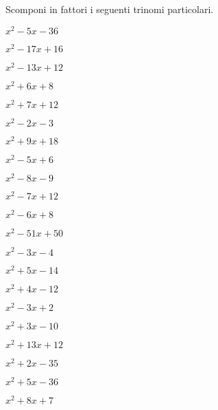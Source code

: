 \subsubsection*{}

\begin{esercizio}
 \label{ese:17.1}
 Scomponi in fattori i seguenti trinomi particolari.
 \begin{multicols}{3}
 \begin{enumeratea}
 \item $x^{2}-5x-36$
 \item $x^{2}-17x+16$
 \item $x^{2}-13x+12$
 \item $x^{2}+6x+8$
 \item $x^{2}+7x+12$
 \item $x^{2}-2x-3$
 \item $x^{2}+9x+18$
 \item $x^{2}-5x+6$
 \item $x^{2}-8x-9$
 \item $x^{2}-7x+12$
 \item $x^{2}-6x+8$
 \item $x^{2}-51x+50$
 \item $x^{2}-3x-4$
 \item $x^{2}+5x-14$
 \item $x^{2}+4x-12$
 \item $x^{2}-3x+2$
 \item $x^{2}+3x-10$
 \item $x^{2}+13x+12$
 \item $x^{2}+2x-35$
 \item $x^{2}+5x-36$
 \item $x^{2}+8x+7$
 \end{enumeratea}
\end{multicols}
\end{esercizio}

